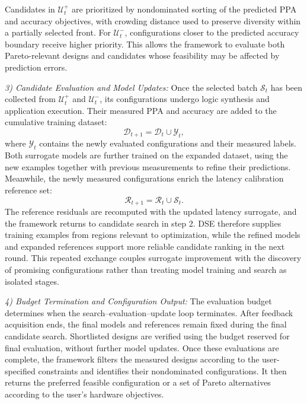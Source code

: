 Candidates in $\mathcal{U}_t^{+}$ are prioritized by nondominated sorting of the predicted PPA and accuracy objectives, with crowding distance used to preserve diversity within a partially selected front. For $\mathcal{U}_t^{-}$, configurations closer to the predicted accuracy boundary receive higher priority. This allows the framework to evaluate both Pareto-relevant designs and candidates whose feasibility may be affected by prediction errors.



\noindent\textit{3) Candidate Evaluation and Model Updates:}
Once the selected batch $\mathcal{S}_t$ has been collected from $\mathcal{U}_t^{+}$ and $\mathcal{U}_t^{-}$, its configurations undergo logic synthesis and application execution. Their measured PPA and accuracy are added to the cumulative training dataset:
\begin{equation}
    \mathcal{D}_{t+1}
    =
    \mathcal{D}_t\cup\mathcal{Y}_t,
    \label{eq:se_dataset_update}
\end{equation}
where $\mathcal{Y}_t$ contains the newly evaluated configurations and their measured labels. Both surrogate models are further trained on the expanded dataset, using the new examples together with previous measurements to refine their predictions. Meanwhile, the newly measured configurations enrich the latency calibration reference set:
\begin{equation}
    \mathcal{R}_{t+1}
    =
    \mathcal{R}_t\cup\mathcal{S}_t.
    \label{eq:se_reference_update}
\end{equation}
The reference residuals are recomputed with the updated latency surrogate, and the framework returns to candidate search in step 2. DSE therefore supplies training examples from regions relevant to optimization, while the refined models and expanded references support more reliable candidate ranking in the next round. This repeated exchange couples surrogate improvement with the discovery of promising configurations rather than treating model training and search as isolated stages.


\noindent\textit{4) Budget Termination and Configuration Output:}
The evaluation budget determines when the search--evaluation--update loop terminates. After feedback acquisition ends, the final models and references remain fixed during the final candidate search. Shortlisted designs are verified using the budget reserved for final evaluation, without further model updates. Once these evaluations are complete, the framework filters the measured designs according to the user-specified constraints and identifies their nondominated configurations. It then returns the preferred feasible configuration or a set of Pareto alternatives according to the user's hardware objectives.
